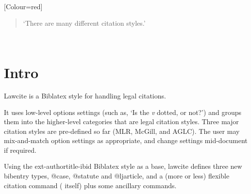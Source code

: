 \newcommand\mypackage[1]{\textsc{#1}}
\newcommand\myoption[1]{\textcolor{blue}{\textsf{#1}}}

\newfontface{}[Colour=red]
\newcommand\ci{{\fcircled\Uchar9312}}%
\newcommand\cii{{\fcircled\Uchar9313}}
\newcommand\ciii{{\fcircled\Uchar9314}}
\newcommand\civ{{\fcircled\Uchar9315}}
\newcommand\cv{{\fcircled\Uchar9316}}


\maketitle
\begin{quotation}
`There are many different citation styles.' 
\medskip

\end{quotation}

\newpage
\tableofcontents

\let\xoldtwocolumn\twocolumn
\iftoggle{printlegtoc}{%
\let\oldtwocolumn\twocolumn
\renewcommand{\twocolumn}[1][]{#1}
\let\oldclearpage\clearpage
\renewcommand\clearpage{\relax}
\extendtheindex{}{\useindexpreamble}{}{}
\printindex[cases]
\printindex[legislation]
\iftoggle{printregulations}{\printindex[regulations]}{}
\renewcommand{\twocolumn}[1][]{\oldtwocolumn}
\renewcommand\clearpage{\oldclearpage}
}{}
\bigskip
\hfill{}\hfill\ %
\bigskip




\section{Intro}
\p Lawcite is a Biblatex style for handling legal citations.

\p It uses low-level options settings (such as, `Is the \textit{v} dotted, or not?') and groups them into the higher-level categories that are legal citation styles. Three major citation styles are pre-defined so far (MLR, McGill, and AGLC). The user may mix-and-match option settings as  appropriate, and change settings mid-document if required.

\p Using the ext-authortitle-ibid Biblatex style as a base, lawcite defines three new bibentry types, @case, @statute and @ljarticle, and a (more or less) flexible citation command ( itself) plus some ancillary commands. 

